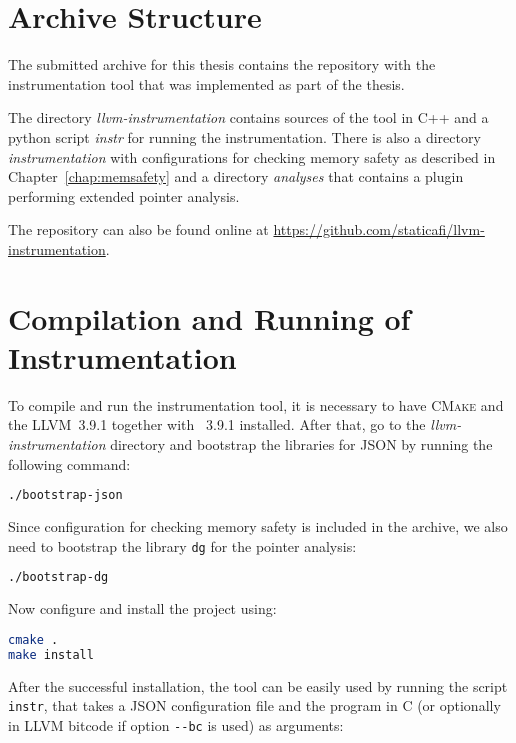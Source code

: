 
\section{Archive Structure}

The submitted archive for this thesis contains the repository with the
instrumentation tool that was implemented as part of the thesis.

The directory \emph{llvm-instrumentation} contains sources of the tool in C++
and a python script \emph{instr} for running the instrumentation. There is also
a directory \emph{instrumentation} with configurations for checking memory
safety as described in Chapter~\ref{chap:memsafety} and a directory
\emph{analyses} that contains a plugin performing extended pointer analysis.

The repository can also be found online at \url{https://github.com/staticafi/llvm-instrumentation}.

\section{Compilation and Running of Instrumentation}

To compile and run the instrumentation tool, it is necessary to have
\textsc{CMake} and the LLVM~3.9.1 together with \clang~3.9.1 installed. After
that, go to the \emph{llvm-instrumentation} directory and bootstrap the
libraries for JSON by running the following command:

\begin{lstlisting}[language=bash]
./bootstrap-json
\end{lstlisting}

\noindent Since configuration for checking memory safety is included in the archive, we
also need to bootstrap the library \texttt{dg} for the pointer analysis:

\begin{lstlisting}[language=bash]
./bootstrap-dg
\end{lstlisting}

\noindent Now configure and install the project using:

\begin{lstlisting}[language=bash]
cmake .
make install
\end{lstlisting}

\noindent After the successful installation, the tool can be easily used by
running the script \texttt{instr}, that takes a JSON configuration file and the
program in C (or optionally in LLVM bitcode if option \texttt{-{}-bc} is used)
as arguments:

